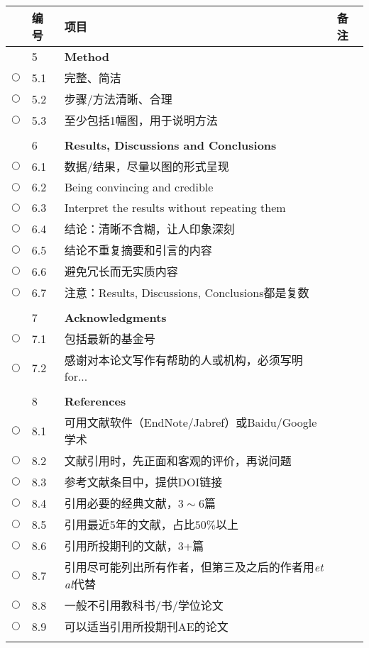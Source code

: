 \documentclass{ctexart}
\begin{document}
\begin{table}[h]
\centering
\begin{tabular}{|c|l|l|l|}
\hline
& 编号 & 项目& 备注\\ \hline
 & 5 & \textcolor[rgb]{0.00,0.00,1.00}{\textbf{Method}}&\\\hline
$\bigcirc$& 5.1 & 完整、简洁 &\\\hline
$\bigcirc$& 5.2 & 步骤/方法清晰、合理 &\\\hline
$\bigcirc$& 5.3 & 至少包括1幅图，用于说明方法 &\\\hline
$ $&  &  &\\\hline

 & 6 & \textcolor[rgb]{0.00,0.00,1.00}{\textbf{Results, Discussions and Conclusions}}&\\\hline
$\bigcirc$& 6.1 & 数据/结果，尽量以图的形式呈现 &\\\hline
$\bigcirc$& 6.2 & Being convincing and credible &\\\hline
$\bigcirc$& 6.3 & Interpret the results without repeating them &\\\hline
$\bigcirc$& 6.4 & 结论：清晰不含糊，让人印象深刻 &\\\hline
$\bigcirc$& 6.5 & 结论不重复摘要和引言的内容 &\\\hline
$\bigcirc$& 6.6 & 避免冗长而无实质内容 &\\\hline
$\bigcirc$& 6.7 & 注意：Results, Discussions, Conclusions都是复数 &\\\hline
$ $&  &  &\\\hline

 & 7 & \textcolor[rgb]{0.00,0.00,1.00}{\textbf{Acknowledgments}}&\\\hline
$\bigcirc$& 7.1 & 包括最新的基金号 &\\\hline
$\bigcirc$& 7.2 & 感谢对本论文写作有帮助的人或机构，必须写明for... &\\\hline
$ $&  &  &\\\hline

& 8 & \textcolor[rgb]{0.00,0.00,1.00}{\textbf{References}}&\\\hline
$\bigcirc$& 8.1 & 可用文献软件（EndNote/Jabref）或Baidu/Google学术 &\\\hline
$\bigcirc$& 8.2 & 文献引用时，先正面和客观的评价，再说问题&\\\hline
$\bigcirc$& 8.3 & 参考文献条目中，提供DOI链接&\\\hline
$\bigcirc$& 8.4 & 引用必要的经典文献，$3\sim6$篇&\\\hline
$\bigcirc$& 8.5 & 引用最近5年的文献，占比$50\%$以上&\\\hline
$\bigcirc$& 8.6 & 引用所投期刊的文献，3+篇&\\\hline
$\bigcirc$& 8.7 & 引用尽可能列出所有作者，但第三及之后的作者用\emph{et al}代替&\\\hline
$\bigcirc$& 8.8 & 一般不引用教科书/书/学位论文&\\\hline
$\bigcirc$& 8.9 & 可以适当引用所投期刊AE的论文&\\\hline
$ $&  &  &\\\hline


\end{tabular}
\end{table}
\end{document}
